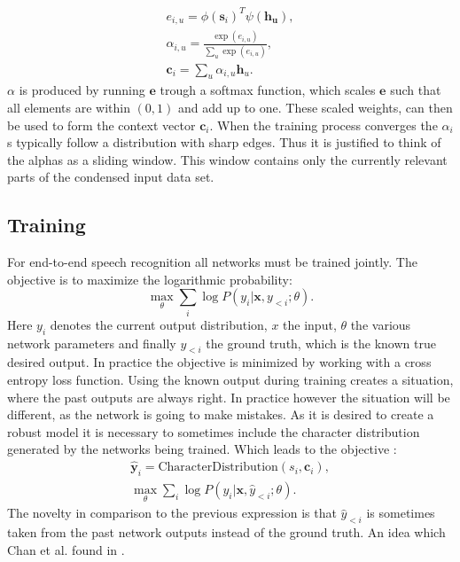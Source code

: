 \documentclass{article}
\begin{document}
\begin{align}
e_{i,u} = \phi(\mathbf{s}_i)^T \psi(\mathbf{h_u}), \\
\alpha_{i,u} = \frac{ \exp(e_{i,u})}{ \sum\limits_{u} \exp(e_{i,u})}, \\
\label{eq:alphas}
\mathbf{c}_i = \sum\limits_{u} \alpha_{i,u} \mathbf{h}_u.
\end{align}
$\alpha$ is produced by running $\mathbf{e}$ trough a softmax function, which scales $\mathbf{e}$ such that all elements are within $(0,1)$ and add up to one. These scaled weights, can then be used to form the context vector $\mathbf{c}_i$. When the training process converges the $\alpha_i$s typically follow a distribution with sharp edges\cite{Chan2015}. Thus it is justified to think of the alphas as a sliding window. This window contains only the currently relevant parts of the condensed input data set.

\subsection{Training}
For end-to-end speech recognition all networks must be trained jointly. The objective is to maximize the logarithmic probability:
\begin{equation}
\max\limits_\theta \sum\limits_{i} \log P(y_i | \mathbf{x}, y_{<i};\theta).
\end{equation}
Here $y_i$ denotes the current output distribution, $x$ the input, $\theta$ the various network parameters and finally $y_{<i}$ the ground truth, which is the known true desired output. In practice the objective is minimized by working with a cross entropy loss function.
Using the known output during training creates a situation, where the past outputs are always right. In practice however the situation will be different, as the network is going to make mistakes. As it is desired to create a robust model it is necessary to sometimes include the character distribution generated by the networks being trained.
Which leads to the objective \cite{Chan2015}:
\begin{align}
\hat{\mathbf{y}}_{i} = \text{CharacterDistribution}(s_i,\textbf{c}_i), \\
\max_{\theta} \sum\limits_{i} \log P(y_i|\mathbf{x}, \hat{y}_{<i};\theta).
\end{align}
The novelty in comparison to the previous expression is that $\hat{y}_{<i}$ is sometimes taken from the past network outputs instead of the ground truth. An idea which Chan et al. found in \cite{Bengio2015}.
\end{document}
